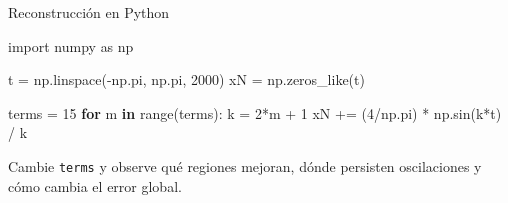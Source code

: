\documentclass[
  ignorenonframetext,
  aspectratio=169,
  spanish,
  professionalfonts]{beamer}
\newenvironment{Shaded}{\begin{snugshade}}{\end{snugshade}}
\newcommand{\BuiltInTok}[1]{\textcolor[rgb]{0.00,0.23,0.31}{#1}}
\newcommand{\ControlFlowTok}[1]{\textcolor[rgb]{0.00,0.23,0.31}{\textbf{#1}}}
\newcommand{\DecValTok}[1]{\textcolor[rgb]{0.68,0.00,0.00}{#1}}
\newcommand{\ImportTok}[1]{\textcolor[rgb]{0.00,0.46,0.62}{#1}}
\newcommand{\KeywordTok}[1]{\textcolor[rgb]{0.00,0.23,0.31}{\textbf{#1}}}
\newcommand{\NormalTok}[1]{\textcolor[rgb]{0.00,0.23,0.31}{#1}}
\newcommand{\OperatorTok}[1]{\textcolor[rgb]{0.37,0.37,0.37}{#1}}
\begin{document}
\begin{frame}[fragile]{Reconstrucción en Python}
\protect{}\label{reconstrucciuxf3n-en-python}
\begin{Shaded}
\begin{Highlighting}[]
\ImportTok{import}\NormalTok{ numpy }\ImportTok{as}\NormalTok{ np}

\NormalTok{t }\OperatorTok{=}\NormalTok{ np.linspace(}\OperatorTok{{-}}\NormalTok{np.pi, np.pi, }\DecValTok{2000}\NormalTok{)}
\NormalTok{xN }\OperatorTok{=}\NormalTok{ np.zeros\_like(t)}

\NormalTok{terms }\OperatorTok{=} \DecValTok{15}
\ControlFlowTok{for}\NormalTok{ m }\KeywordTok{in} \BuiltInTok{range}\NormalTok{(terms):}
\NormalTok{    k }\OperatorTok{=} \DecValTok{2}\OperatorTok{*}\NormalTok{m }\OperatorTok{+} \DecValTok{1}
\NormalTok{    xN }\OperatorTok{+=}\NormalTok{ (}\DecValTok{4}\OperatorTok{/}\NormalTok{np.pi) }\OperatorTok{*}\NormalTok{ np.sin(k}\OperatorTok{*}\NormalTok{t) }\OperatorTok{/}\NormalTok{ k}
\end{Highlighting}
\end{Shaded}

\begin{tcolorbox}[enhanced jigsaw, arc=.35mm, bottomrule=.15mm, bottomtitle=1mm, breakable, colback=white, colbacktitle=quarto-callout-tip-color!10!white, colframe=quarto-callout-tip-color-frame, coltitle=black, left=2mm, leftrule=.75mm, opacityback=0, opacitybacktitle=0.6, rightrule=.15mm, title={Experimento}, titlerule=0mm, toprule=.15mm, toptitle=1mm]

Cambie \texttt{terms} y observe qué regiones mejoran, dónde persisten
oscilaciones y cómo cambia el error global.

\end{tcolorbox}
\end{frame}
\end{document}

